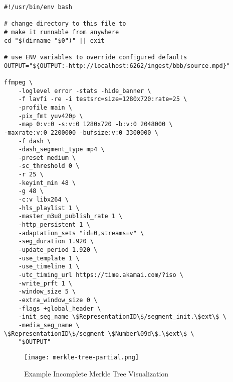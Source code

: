 
\begin{appendix}

\begin{minipage}{\linewidth}
\begin{lstlisting}[caption={Example FFmpeg Shell Script}, label=ex:shell, captionpos=b]
#!/usr/bin/env bash

# change directory to this file to  
# make it runnable from anywhere
cd "$(dirname "$0")" || exit
    
# use ENV variables to override configured defaults
OUTPUT="${OUTPUT:-http://localhost:6262/ingest/bbb/source.mpd}"
    
ffmpeg \
    -loglevel error -stats -hide_banner \
    -f lavfi -re -i testsrc=size=1280x720:rate=25 \
    -profile main \
    -pix_fmt yuv420p \
    -map 0:v:0 -s:v:0 1280x720 -b:v:0 2048000 \
-maxrate:v:0 2200000 -bufsize:v:0 3300000 \
    -f dash \
    -dash_segment_type mp4 \
    -preset medium \
    -sc_threshold 0 \
    -r 25 \
    -keyint_min 48 \
    -g 48 \
    -c:v libx264 \
    -hls_playlist 1 \
    -master_m3u8_publish_rate 1 \
    -http_persistent 1 \
    -adaptation_sets "id=0,streams=v" \
    -seg_duration 1.920 \
    -update_period 1.920 \
    -use_template 1 \
    -use_timeline 1 \
    -utc_timing_url https://time.akamai.com/?iso \
    -write_prft 1 \
    -window_size 5 \
    -extra_window_size 0 \
    -flags +global_header \
    -init_seg_name \$RepresentationID\$/segment_init.\$ext\$ \
    -media_seg_name \
\$RepresentationID\$/segment_\$Number%09d\$.\$ext\$ \
    "$OUTPUT"
\end{lstlisting}
\end{minipage}

\begin{figure}
    \centering
    \texttt{[image: merkle-tree-partial.png]}
    \caption{Example Incomplete Merkle Tree Visualization}
    \label{fig:incomple_mt}
\end{figure}

\end{appendix}

\endinput
